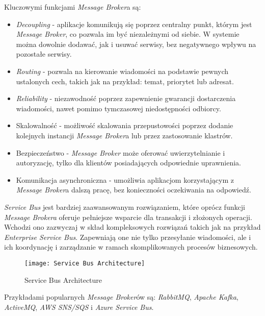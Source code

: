 \par Kluczowymi funkcjami \emph{Message Broker}a są:
\begin{itemize}
    \item \emph{Decoupling} - aplikacje komunikują się poprzez centralny punkt, którym jest \emph{Message Broker}, co pozwala im być niezależnymi od siebie. W systemie można dowolnie dodawać, jak i usuwać serwisy, bez negatywnego wpływu na pozostałe serwisy.
    \item \emph{Routing} - pozwala na kierowanie wiadomości na podstawie pewnych ustalonych cech, takich jak na przykład: temat, priorytet lub adresat.
    \item \emph{Reliability} - niezawodność poprzez zapewnienie gwarancji dostarczenia wiadomości, nawet pomimo tymczasowej niedostępności odbiorcy.
    \item Skalowalność - możliwość skalowania przepustowości poprzez dodanie kolejnych instancji \emph{Message Broker}a lub przez zastosowanie klastrów.
    \item Bezpieczeństwo - \emph{Message Broker} może oferować uwierzytelnianie i autoryzację, tylko dla klientów posiadających odpowiednie uprawnienia.
    \item Komunikacja asynchroniczna - umożliwia aplikacjom korzystającym z \emph{Message Broker}a dalszą pracę, bez konieczności oczekiwania na odpowiedź.
\end{itemize}

\par \emph{Service Bus} jest bardziej zaawansowanym rozwiązaniem, które oprócz funkcji \emph{Message Brokera} oferuje pełniejsze wsparcie dla transakcji i złożonych operacji. Wchodzi ono zazwyczaj w skład kompleksowych rozwiązań takich jak na przykład \emph{Enterprise Service Bus}. Zapewniają one nie tylko przesyłanie wiadomości, ale i ich koordynację i zarządzanie w ramach skomplikowanych procesów biznesowych.

\begin{figure}
    \centering
    \texttt{[image: Service Bus Architecture]}
    \caption{Service Bus Architecture}
    \label{fig:serviceBusArchitecture}
\end{figure}

\par Przykładami popularnych \emph{Message Broker}ów są: \emph{RabbitMQ}, \emph{Apache Kafka}, \emph{ActiveMQ}, \emph{AWS SNS/SQS} i \emph{Azure Service Bus}.